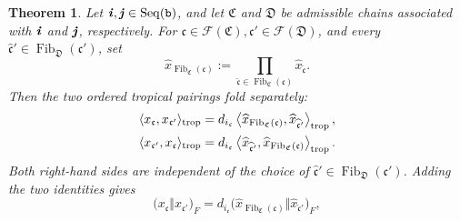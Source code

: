 \documentclass[12pt, leqno]{amsart}
\numberwithin{equation}{section}
\theoremstyle{plain}
\newtheorem{theorem}[lemma]{Theorem}
\theoremstyle{definition}
\newcommand{\seteq}{\mathbin{:=}}
\newcommand{\trop}{{\rm trop}}
\newcommand{\ii}{ \textbf{\textit{i}}}
\newcommand{\jj}{ \textbf{\textit{j}}}
\newcommand{\Fib}{\operatorname{Fib}}
\newcommand{\hx}{\widehat{x}}
\newcommand{\frakC}{\mathfrak{C}}
\newcommand{\frakD}{\mathfrak{D}}
\newcommand{\frakc}{\mathfrak{c}}
\newcommand{\hfrakc}{\widehat{\frakc}}
\newcommand{\calF}{\mathcal{F}}
\newcommand{\ttb}{\mathtt{b}}
\newcommand{\Seq}{\mathrm{Seq}}
\begin{document}
\begin{theorem}\label{thm: folding of F-invariants between box variables}
Let $\ii,\jj\in\Seq(\ttb)$,
and let \(\frakC\) and \(\frakD\) be admissible chains associated
with \(\ii\) and \(\jj\), respectively.  For $\frakc\in\calF(\frakC),\frakc'\in\calF(\frakD)$, and every
$\hfrakc'\in\Fib_{\frakD}(\frakc')$,
set
\[
\hx_{\Fib_{\frakC}(\frakc)}
\seteq
\prod_{\hfrakc\in\Fib_{\frakC}(\frakc)}\hx_{\hfrakc}.
\]
Then the two ordered tropical pairings fold separately:
\begin{align}
\label{eq: folding of first ordered tropical pairing}
\langle x_{\frakc},x_{\frakc'}\rangle_{\trop}
&=d_{i_{\frakc}}
\left\langle
\hx_{\Fib_{\frakC}(\frakc)},\hx_{\hfrakc'}
\right\rangle_{\trop},\\
\label{eq: folding of second ordered tropical pairing}
\langle x_{\frakc'},x_{\frakc}\rangle_{\trop}
&=d_{i_{\frakc}}
\left\langle
\hx_{\hfrakc'},\hx_{\Fib_{\frakC}(\frakc)}
\right\rangle_{\trop}.
\end{align}
Both right-hand sides are independent of the choice of
\(\hfrakc'\in\Fib_{\frakD}(\frakc')\).  Adding the two identities
gives
\begin{equation}\label{eq: folding of F-invariants between box variables}
\bigl(x_\frakc \Vert x_{\frakc'} \bigr)_F = d_{i_\frakc} \bigl( \hx_{\Fib_{\frakC}(\frakc)} \Vert \hx_{\hfrakc'} \bigr)_F,
\end{equation}
\end{theorem}
\end{document}
